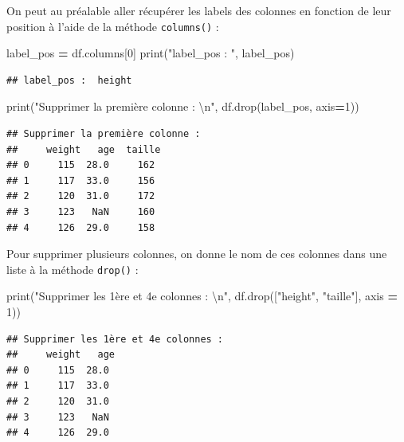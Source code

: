 \documentclass[12pt,]{book}
\newenvironment{Shaded}{\begin{snugshade}}{\end{snugshade}}
\newcommand{\DecValTok}[1]{\textcolor[rgb]{0.00,0.00,0.81}{#1}}
\newcommand{\CharTok}[1]{\textcolor[rgb]{0.31,0.60,0.02}{#1}}
\newcommand{\StringTok}[1]{\textcolor[rgb]{0.31,0.60,0.02}{#1}}
\newcommand{\OperatorTok}[1]{\textcolor[rgb]{0.81,0.36,0.00}{\textbf{#1}}}
\newcommand{\BuiltInTok}[1]{#1}
\newcommand{\NormalTok}[1]{#1}
\numberwithin{equation}{section}
\numberwithin{countremarque}{section}
\begin{document}
On peut au préalable aller récupérer les labels des colonnes en fonction
de leur position à l'aide de la méthode \texttt{columns()} :

\begin{Shaded}
\begin{Highlighting}[]
\NormalTok{label_pos }\OperatorTok{=}\NormalTok{ df.columns[}\DecValTok{0}\NormalTok{]}
\BuiltInTok{print}\NormalTok{(}\StringTok{"label_pos : "}\NormalTok{, label_pos)}
\end{Highlighting}
\end{Shaded}

\begin{lstlisting}
## label_pos :  height
\end{lstlisting}

\begin{Shaded}
\begin{Highlighting}[]
\BuiltInTok{print}\NormalTok{(}\StringTok{"Supprimer la première colonne :  }\CharTok{\textbackslash{}n}\StringTok{"}\NormalTok{, df.drop(label_pos, axis}\OperatorTok{=}\DecValTok{1}\NormalTok{))}
\end{Highlighting}
\end{Shaded}

\begin{lstlisting}
## Supprimer la première colonne :  
##     weight   age  taille
## 0     115  28.0     162
## 1     117  33.0     156
## 2     120  31.0     172
## 3     123   NaN     160
## 4     126  29.0     158
\end{lstlisting}

Pour supprimer plusieurs colonnes, on donne le nom de ces colonnes dans
une liste à la méthode \texttt{drop()} :

\begin{Shaded}
\begin{Highlighting}[]
\BuiltInTok{print}\NormalTok{(}\StringTok{"Supprimer les 1ère et 4e colonnes :  }\CharTok{\textbackslash{}n}\StringTok{"}\NormalTok{, df.drop([}\StringTok{"height"}\NormalTok{, }\StringTok{"taille"}\NormalTok{], axis }\OperatorTok{=} \DecValTok{1}\NormalTok{))}
\end{Highlighting}
\end{Shaded}

\begin{lstlisting}
## Supprimer les 1ère et 4e colonnes :  
##     weight   age
## 0     115  28.0
## 1     117  33.0
## 2     120  31.0
## 3     123   NaN
## 4     126  29.0
\end{lstlisting}
\end{document}

